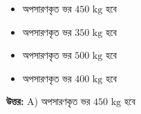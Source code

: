 \documentclass[12pt, a4paper]{article}
\begin{document}
\begin{itemize}[label={}, leftmargin=1cm, itemsep=0.5em]
    \item[\textbf{A)}] অপসারণকৃত ভর $450\text{ kg}$ হবে
    \item[\textbf{B)}] অপসারণকৃত ভর $350\text{ kg}$ হবে
    \item[\textbf{C)}] অপসারণকৃত ভর $500\text{ kg}$ হবে
    \item[\textbf{D)}] অপসারণকৃত ভর $400\text{ kg}$ হবে
\end{itemize}

\vspace{0.5em}
\begin{tcolorbox}[answerbox]
    \textbf{\color{success} উত্তর:} A) অপসারণকৃত ভর $450\text{ kg}$ হবে
\end{tcolorbox}
\vspace{1em}
\end{document}
